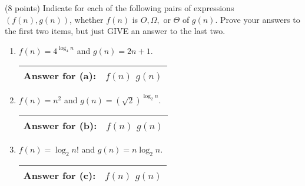 \documentclass[11pt]{article}
\begin{document}
\begin{problems}

\item (8 points) Indicate for each of the following pairs of expressions $(f(n),g(n))$,
whether $f(n)$ is  $O, \Omega,$ or $\Theta$ of $g(n)$.  Prove your answers to the first two items, but just GIVE an answer to the last two.
\begin{enumerate}
\item $f(n)=4^{\log_{4} n}$ and $g(n)=2n+1$.
\vspace{1in}
\begin{table}[!h]  \flushright \renewcommand{\arraystretch}{2}  \begin{tabular}{|l|c| } \hline
Answer for (a): &  \hspace{.15in} $f(n)$ \hspace{.5in} $g(n)$ \hspace{.15in}\\
\hline \end{tabular} \end{table}

\item $f(n)= n^2$ and $g(n)=(\sqrt{2})^{\log_2 n}$.
\vspace{1in}
\begin{table}[!h]  \flushright \renewcommand{\arraystretch}{2}  \begin{tabular}{|l|c| } \hline
Answer for (b): & \hspace{.15in} $f(n)$ \hspace{.5in} $g(n)$ \hspace{.15in}\\
\hline \end{tabular} \end{table}

\item $f(n) =\log_2 n!$ and $g(n) =n \log_2 n$.
\vspace{.25in}
\begin{table}[!h]  \flushright \renewcommand{\arraystretch}{2}  \begin{tabular}{|l|c| } \hline
Answer for (c): & \hspace{.15in} $f(n)$ \hspace{.5in} $g(n)$ \hspace{.15in}\\
\hline \end{tabular} \end{table}


\end{enumerate}
\end{problems}
\end{document}
